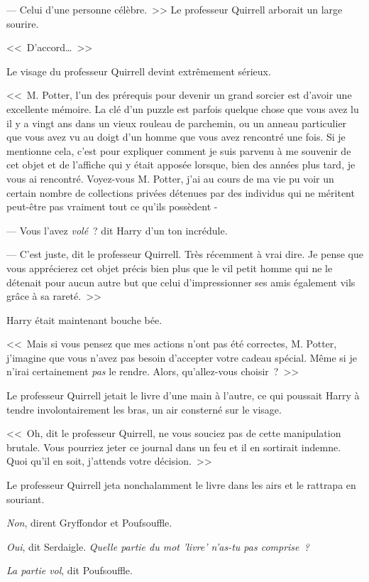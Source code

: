 --- Celui d'une personne célèbre.~>> Le professeur Quirrell arborait un large sourire.

<<~D'accord…~>>

Le visage du professeur Quirrell devint extrêmement sérieux.

<<~M. Potter, l'un des prérequis pour devenir un grand sorcier est d'avoir une excellente mémoire. La clé d'un puzzle est parfois quelque chose que vous avez lu il y a vingt ans dans un vieux rouleau de parchemin, ou un anneau particulier que vous avez vu au doigt d'un homme que vous avez rencontré une fois. Si je mentionne cela, c'est pour expliquer comment je suis parvenu à me souvenir de cet objet et de l'affiche qui y était apposée lorsque, bien des années plus tard, je vous ai rencontré. Voyez-vous M. Potter, j'ai au cours de ma vie pu voir un certain nombre de collections privées détenues par des individus qui ne méritent peut-être pas vraiment tout ce qu'ils possèdent -

--- Vous l'avez \emph{volé}~? dit Harry d'un ton incrédule.

--- C'est juste, dit le professeur Quirrell. Très récemment à vrai dire. Je pense que vous apprécierez cet objet précis bien plus que le vil petit homme qui ne le détenait pour aucun autre but que celui d'impressionner ses amis également vils grâce à sa rareté.~>>

Harry était maintenant bouche bée.

<<~Mais si vous pensez que mes actions n'ont pas été correctes, M. Potter, j'imagine que vous n'avez pas besoin d'accepter votre cadeau spécial. Même si je n'irai certainement \emph{pas} le rendre. Alors, qu'allez-vous choisir~?~>>

Le professeur Quirrell jetait le livre d'une main à l'autre, ce qui poussait Harry à tendre involontairement les bras, un air consterné sur le visage.

<<~Oh, dit le professeur Quirrell, ne vous souciez pas de cette manipulation brutale. Vous pourriez jeter ce journal dans un feu et il en sortirait indemne. Quoi qu'il en soit, j'attends votre décision.~>>

Le professeur Quirrell jeta nonchalamment le livre dans les airs et le rattrapa en souriant.

\emph{Non}, dirent Gryffondor et Poufsouffle.

\emph{Oui}, dit Serdaigle. \emph{Quelle partie du mot 'livre' n'as-tu pas comprise~?}

\emph{La partie vol}, dit Poufsouffle.

